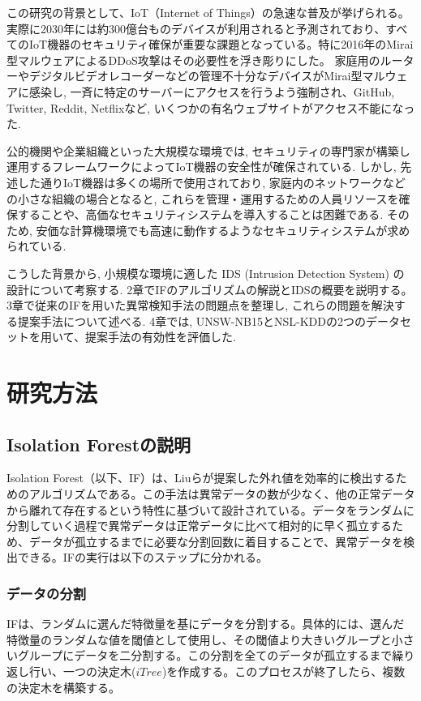 \documentclass{css}
\begin{document}
この研究の背景として、IoT（Internet of Things）の急速な普及が挙げられる。実際に2030年には約300億台ものデバイスが利用されると予測されており\cite{Vailshery2022}、すべてのIoT機器のセキュリティ確保が重要な課題となっている。特に2016年のMirai型マルウェアによるDDoS攻撃はその必要性を浮き彫りにした\cite{8115504}。 家庭用のルーターやデジタルビデオレコーダーなどの管理不十分なデバイスがMirai型マルウェアに感染し, 一斉に特定のサーバーにアクセスを行うよう強制され、GitHub, Twitter, Reddit, Netflixなど, いくつかの有名ウェブサイトがアクセス不能になった.

公的機関や企業組織といった大規模な環境では, セキュリティの専門家が構築し運用するフレームワークによってIoT機器の安全性が確保されている. しかし, 先述した通りIoT機器は多くの場所で使用されており, 家庭内のネットワークなどの小さな組織の場合となると, これらを管理・運用するための人員リソースを確保することや、高価なセキュリティシステムを導入することは困難である. そのため, 安価な計算機環境でも高速に動作するようなセキュリティシステムが求められている.

こうした背景から, 小規模な環境に適した IDS (Intrusion Detection System) の設計について考察する. 2章でIFのアルゴリズムの解説とIDSの概要を説明する。3章で従来のIFを用いた異常検知手法の問題点を整理し, これらの問題を解決する提案手法について述べる. 4章では, UNSW-NB15とNSL-KDDの2つのデータセットを用いて、提案手法の有効性を評価した.

\section{研究方法}

\subsection{Isolation Forestの説明}

Isolation Forest（以下、IF）は、Liuらが提案した\cite{Liu2008-bc}外れ値を効率的に検出するためのアルゴリズムである。この手法は異常データの数が少なく、他の正常データから離れて存在するという特性に基づいて設計されている。データをランダムに分割していく過程で異常データは正常データに比べて相対的に早く孤立するため、データが孤立するまでに必要な分割回数に着目することで、異常データを検出できる。IFの実行は以下のステップに分かれる。

\subsubsection{データの分割}

IFは、ランダムに選んだ特徴量を基にデータを分割する。具体的には、選んだ特徴量のランダムな値を閾値として使用し、その閾値より大きいグループと小さいグループにデータを二分割する。この分割を全てのデータが孤立するまで繰り返し行い、一つの決定木($iTree$)を作成する。このプロセスが終了したら、複数の決定木を構築する。
\end{document}
